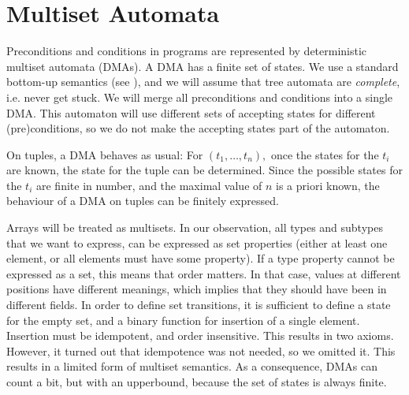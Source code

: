 
\section{Multiset Automata}
\label{Sect_DMA}

Preconditions and conditions in programs are represented by
deterministic multiset automata (DMAs).
A DMA has a finite set of states. 
We use a standard bottom-up semantics (see \cite{TATA2007}),
and we will assume that tree automata are \emph{complete}, i.e.
never get stuck. 
We will merge all preconditions and conditions into a single
DMA. This automaton will use different sets of accepting states
for different (pre)conditions, 
so we do not make the accepting states part of the
automaton. 

On tuples, a DMA behaves as usual: For 
$ ( t_1, \ldots, t_n ), $ once the states for the
$ t_i $ are known, the state for the
tuple can be determined. Since the possible states
for the $ t_i $ are finite in number, and the maximal
value of $ n $ is a priori known, the behaviour
of a DMA on tuples can be finitely expressed.

Arrays will be treated as multisets. In our observation,
all types and subtypes that 
we want to express, can be expressed as set properties
(either at least one element, or all elements must have some property). 
If a type property
cannot be expressed as a set, this means that order matters.
In that case, values at different positions have different meanings,
which implies that they should have been in different fields.
In order to define set transitions, it is sufficient to 
define a state for the empty set, and a binary function for
insertion of a single element. Insertion must be idempotent, 
and order insensitive. This results in two axioms. However, it turned out
that idempotence was not needed, so we omitted it.
This results in a limited form of multiset semantics. 
As a consequence, DMAs can count a bit, but 
with an upperbound, because the set of states is always finite.

